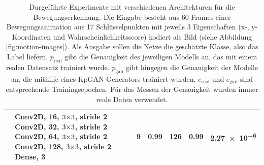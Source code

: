 \begin{table}
\begin{tabularx}{\textwidth}{l|X||c|c||c|c||c}
        & Conv2D, 16, $3 {\mkern-0.3mu\times\mkern-0.3mu} 3$, stride 2 \newline Conv2D, 32, $3 {\mkern-0.3mu\times\mkern-0.3mu} 3$, stride 2 \newline Conv2D, 64, $3 {\mkern-0.3mu\times\mkern-0.3mu} 3$, stride 2 \newline Conv2D, 128, $3 {\mkern-0.3mu\times\mkern-0.3mu} 3$, stride 2 \newline Dense, 3 & 9 & 0.99 & 126 & 0.99 & \num{2.27e-6} \\ \hline
    \end{tabularx}
    \caption{Durgeführte Experimente mit verschiedenen Architekturen für die
    Bewegungserkennung. Die Eingabe besteht aus 60 Frames einer
    Bewegungsanimation aus 17 Schlüsselpunkten mit jeweils 3 Eigenschaften (x-,
    y-Koordinaten und Wahrscheinlichkeitsscore) kodiert als Bild (siehe
    Abbildung \ref{fig:motion-images}). Als Ausgabe sollen die Netze die
    geschätzte Klasse, also das Label liefern. $p_\mathrm{real}$ gibt die
    Genauigkeit des jeweiligen Modells an, das mit einem realen Datensatz
    trainiert wurde. $p_\mathrm{gan}$ gibt hingegen die Genauigkeit der Modelle
    an, die mithilfe eines KpGAN-Generators trainiert wurden. $e_\mathrm{real}$ und $e_\mathrm{gan}$ sind entsprechende Trainingsepochen. Für das Messen der
    Genauigkeit wurden immer reale Daten verwendet.}
    \label{table:motion-detection}
\end{table}
